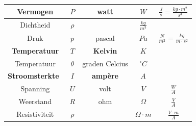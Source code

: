 \documentclass{ximera}
\begin{document}
\begin{longtable}{|c|c||c|c|c|}
\hline
Vermogen                                    & $P$                                      & watt                                       & $W$                                 & $\frac{J}{s} = \frac{kg\cdot m^2}{s^3}$                   \\ 
\hline
Dichtheid                                  & $\rho$                                  &                                           & $\frac{kg}{m^3}$                    &                                                           \\ 
\hline
Druk                                        & $p$                                      & pascal                                    & $Pa$                                & $\frac{N}{m^2} =\frac{kg}{m\cdot s^2}$                     \\ 
\hline
\cellcolor{blue!60!green}\textbf{Temperatuur}                       & \cellcolor{blue!60!green}\textbf{$T$}                             & \cellcolor{blue!60!green}\textbf{Kelvin}                            & \cellcolor{blue!60!green}$K$                                 & \cellcolor{blue!60!green}                                                          \\ 
\hline
Temperatuur                                & $\theta$                                      & graden Celcius                             & $ ^{\circ} C$                       &                                                          \\ 
\hline
\cellcolor{green!65!blue}\textbf{Stroomsterkte}~                      & \cellcolor{green!65!blue}\textbf{$I$}                             & \cellcolor{green!65!blue}\textbf{ampère}                            & \cellcolor{green!65!blue}$A$                                 & \cellcolor{green!65!blue}                                                          \\ 
\hline
Spanning                                   & $U$                                      & volt                                       & $V$                                 & $\frac{W}{A}$                                             \\ 
\hline
Weerstand                                   & $R$                                      & ohm                                        & $\Omega$                             & $\frac{V}{A}$                                            \\ 
\hline
Resistiviteit                              & $\rho$                                      &                                           & $\Omega\cdot m$                     & $\frac{V \cdot m}{A}$  \\ 

\end{longtable}
\end{document}
